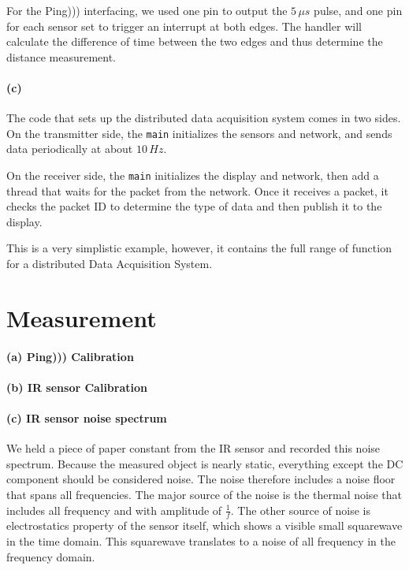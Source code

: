 \documentclass[a4paper]{article}
\begin{document}



For the Ping))) interfacing, we used one pin to output the $ 5 \, \mu s$ pulse, and one pin for each sensor set to
trigger an interrupt at both edges. The handler will calculate the difference of time between the two edges and thus
determine the distance measurement.




\paragraph{(c)} The code that sets up the distributed data acquisition system comes in two sides. On the transmitter side,
the \texttt{main} initializes the sensors and network, and sends data periodically at about $ 10 \, Hz $.



On the receiver side, the \texttt{main} initializes the display and network, then add a thread that waits for the packet
from the network. Once it receives a packet, it checks the packet ID to determine the type of data and then publish it
to the display.



This is a very simplistic example, however, it contains the full range of function for a distributed Data Acquisition System.

\section{Measurement}

\paragraph{(a) Ping))) Calibration}
\paragraph{(b) IR sensor Calibration}

\paragraph{(c) IR sensor noise spectrum} We held a piece of paper constant from the IR sensor and recorded this noise
spectrum. Because the measured object is nearly static, everything except the DC component should be considered noise.
The noise therefore includes a noise floor that spans all frequencies. The major source of the noise is the thermal noise
that includes all frequency and with amplitude of $ \frac{1}{f} $. The other source of noise is electrostatics property
of the sensor itself, which shows a visible small squarewave in the time domain. This squarewave translates to a noise
of all frequency in the frequency domain.
\end{document}
